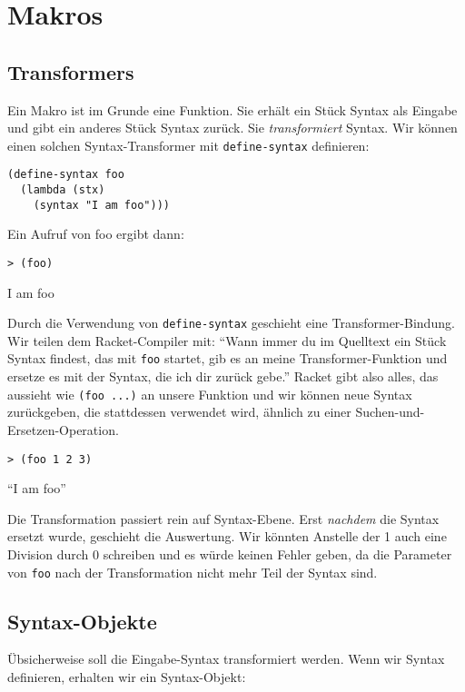 \section{Makros} 
\label{makros}
\subsection{Transformers}

Ein Makro ist im Grunde eine Funktion. Sie erhält ein Stück Syntax als Eingabe und gibt ein anderes Stück Syntax zurück. Sie \textit{transformiert} Syntax. Wir können einen solchen Syntax-Transformer mit \texttt{define-syntax} definieren:

\begin{lstlisting}
(define-syntax foo
  (lambda (stx)
    (syntax "I am foo")))
\end{lstlisting}

Ein Aufruf von foo ergibt dann:

\begin{lstlisting}
> (foo)
\end{lstlisting}
{\routput {\qq}I am foo{\qq}}

Durch die Verwendung von \texttt{define-syntax} geschieht eine Transformer-Bindung. Wir teilen dem Racket-Compiler mit: ``Wann immer du im Quelltext ein Stück Syntax findest, das mit \texttt{foo} startet, gib es an meine Transformer-Funktion und ersetze es mit der Syntax, die ich dir zurück gebe.'' Racket gibt also alles, das aussieht wie \texttt{(foo ...)} an unsere Funktion und wir können neue Syntax zurückgeben, die stattdessen verwendet wird, ähnlich zu einer Suchen-und-Ersetzen-Operation.

\begin{lstlisting}
> (foo 1 2 3)
\end{lstlisting}
{\routput ``I am foo''}

Die Transformation passiert rein auf Syntax-Ebene. Erst \textit{nachdem} die Syntax ersetzt wurde, geschieht die Auswertung. Wir könnten Anstelle der 1 auch eine Division durch 0 schreiben und es würde keinen Fehler geben, da die Parameter von \texttt{foo} nach der Transformation nicht mehr Teil der Syntax sind.

\subsection{Syntax-Objekte}
Übsicherweise soll die Eingabe-Syntax transformiert werden. Wenn wir Syntax definieren, erhalten wir ein Syntax-Objekt:


